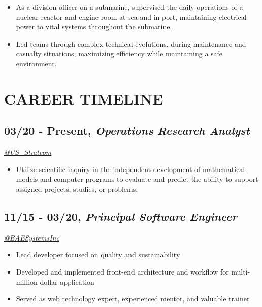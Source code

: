 \documentclass[10pt]{article}
\def\tightlist{}
\begin{document}
\begin{itemize}
\tightlist
\item
  As a division officer on a submarine, supervised the daily operations
  of a nuclear reactor and engine room at sea and in port, maintaining
  electrical power to vital systems throughout the submarine.
\item
  Led teams through complex technical evolutions, during maintenance and
  casualty situations, maximizing efficiency while maintaining a safe
  environment.
\end{itemize}

\hypertarget{career-timeline}{%
\section{CAREER TIMELINE}\label{career-timeline}}

\hypertarget{present-operations-research-analyst}{%
\subsection{\texorpdfstring{03/20 - Present, \textbf{\emph{Operations
Research
Analyst}}}{03/20 - Present, Operations Research Analyst}}\label{present-operations-research-analyst}}

\emph{\href{https://twitter.com/US_Stratcom}{@US\_Stratcom}}

\begin{itemize}
\tightlist
\item
  Utilize scientific inquiry in the independent development of
  mathematical models and computer programs to evaluate and predict the
  ability to support assigned projects, studies, or problems.
\end{itemize}

\hypertarget{principal-software-engineer}{%
\subsection{\texorpdfstring{11/15 - 03/20, \textbf{\emph{Principal
Software
Engineer}}}{11/15 - 03/20, Principal Software Engineer}}\label{principal-software-engineer}}

\emph{\href{https://twitter.com/BAESystemsInc}{@BAESystemsInc}}

\begin{itemize}
\tightlist
\item
  Lead developer focused on quality and sustainability
\item
  Developed and implemented front-end architecture and workflow for
  multi-million dollar application
\item
  Served as web technology expert, experienced mentor, and valuable
  trainer
\end{itemize}
\end{document}
